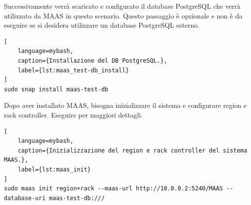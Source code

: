 \bigskip \noindent
Successivamente verrà scaricato e configurato il database PostgreSQL che verrà utilizzato da MAAS in questo scenario.
% 
Questo passaggio è opzionale e non è da eseguire se si desidera utilizzare un database PostgreSQL esterno.
% 
\begin{lstlisting}[
    language=mybash, 
    caption={Installazione del DB PostgreSQL.}, 
    label={lst:maas_test-db_install}
]
sudo snap install maas-test-db
\end{lstlisting}
% 
% 
\bigskip \noindent
Dopo aver installato MAAS, bisogna inizializzare il sistema e configurare region e rack controller.
% 
Eseguire  per maggiori dettagli.
% 
\begin{lstlisting}[
    language=mybash, 
    caption={Inizializzazione del region e rack controller del sistema MAAS.}, 
    label={lst:maas_init}
]
sudo maas init region+rack --maas-url http://10.0.0.2:5240/MAAS --database-uri maas-test-db:///
\end{lstlisting}
% 
% 
